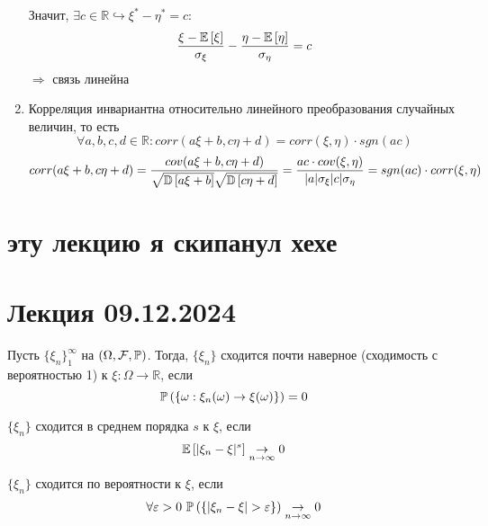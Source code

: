 \documentclass[a4paper, 10pt]{article}
\begin{document}
\begin{enumerate}
    Значит, $\exists c\in\mathbb{R}\hookrightarrow\xi^*-\eta^*=c:$ 
    \begin{equation*}
        \frac{\xi-\mathbb{E}\left[\xi\right]}{\sigma_\xi}-\frac{\eta-\mathbb{E}\left[\eta\right]}{\sigma_\eta}=c
    \end{equation*}
    $\Longrightarrow$ связь линейна

    \item Корреляция инвариантна относительно линейного преобразования случайных величин, то есть
    \begin{equation*}
        \forall a,b,c,d\in\mathbb{R}: corr(a\xi+b,c\eta+d)=corr(\xi,\eta)\cdot sgn(ac)
    \end{equation*}
    \proof 
    \begin{equation*}
        corr(a\xi+b,c\eta+d)=\frac{cov(a\xi+b,c\eta+d)}{\sqrt{\mathbb{D}\left[a\xi+b\right]}\sqrt{\mathbb{D}\left[c\eta+d\right]}}=\frac{ac\cdot cov(\xi,\eta)}{|a|\sigma_\xi|c|\sigma_\eta}=sgn(ac)\cdot corr(\xi,\eta)
    \end{equation*}
\end{enumerate}


\section{эту лекцию я скипанул хехе}
\newpage


\section{Лекция 09.12.2024}
 Пусть $\{\xi_n\}_{1}^{\infty}$ на $(\Omega, \mathcal{F}, \mathbb{P})$. Тогда, $\{\xi_n\}$ сходится почти наверное (сходимость с вероятностью 1) к $\xi:\Omega\to\mathbb{R}$, если 
\begin{equation*}
    \mathbb{P}\left(\{\omega:\xi_n(\omega)\to\xi(\omega)\}\right)=0
\end{equation*}

 $\{\xi_n\}$ сходится в среднем порядка $s$ к $\xi$, если 
\begin{equation*}
    \mathbb{E}\left[|\xi_n-\xi|^s\right]\underset{n\to\infty}{\to}0
\end{equation*}

 $\{\xi_n\}$ сходится по вероятности к $\xi$, если 
\begin{equation*}
    \forall\varepsilon>0\ \prob{|\xi_n-\xi|>\varepsilon}\underset{n\to\infty}{\to}0
\end{equation*}
\end{document}
